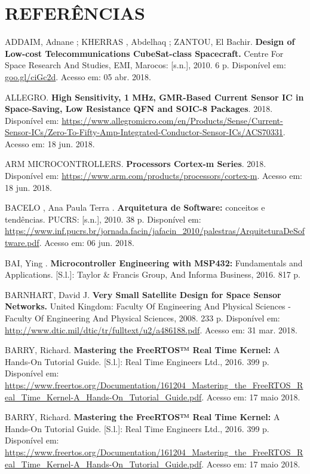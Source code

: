 \chapter[REFERÊNCIAS]{REFERÊNCIAS}

\noindent ADDAIM, Adnane ; KHERRAS , Abdelhaq ; ZANTOU, El Bachir. \textbf{Design of Low-cost Telecommunications CubeSat-class Spacecraft. } Centre For Space Research And Studies, EMI, Marocos: [s.n.], 2010. 6 p. Disponível em: \url{goo.gl/ciGc2d}. Acesso em: 05 abr. 2018.

\noindent ALLEGRO. \textbf{High Sensitivity, 1 MHz, GMR-Based Current Sensor IC  in Space-Saving, Low Resistance QFN and SOIC-8 Packages}. 2018. Disponível em: \url{https://www.allegromicro.com/en/Products/Sense/Current-Sensor-ICs/Zero-To-Fifty-Amp-Integrated-Conductor-Sensor-ICs/ACS70331}. Acesso em: 18 jun. 2018.

\noindent ARM MICROCONTROLLERS. \textbf{Processors Cortex-m Series}. 2018. Disponível em: \url{https://www.arm.com/products/processors/cortex-m}. Acesso em: 18 jun. 2018.

\noindent BACELO , Ana Paula Terra . \textbf{Arquitetura de Software:} conceitos e tendências. PUCRS: [s.n.], 2010. 38 p. Disponível em: \url{https://www.inf.pucrs.br/jornada.facin/jafacin_2010/palestras/ArquiteturaDeSoftware.pdf}. Acesso em: 06 jun. 2018.

\noindent BAI, Ying . \textbf{Microcontroller Engineering with MSP432:} Fundamentals and Applications. [S.l.]: Taylor \& Francis Group, And Informa Business, 2016. 817 p.

\noindent BARNHART, David J. \textbf{Very Small Satellite Design for Space Sensor Networks. } United Kingdom: Faculty Of Engineering And Physical Sciences - Faculty Of Engineering And Physical Sciences, 2008. 233 p. Disponível em: \url{http://www.dtic.mil/dtic/tr/fulltext/u2/a486188.pdf}. Acesso em: 31 mar. 2018.

\noindent BARRY, Richard. \textbf{Mastering the FreeRTOS™ Real Time Kernel:} A Hands-On Tutorial Guide. [S.l.]: Real Time Engineers Ltd., 2016. 399 p. Disponível em: \url{https://www.freertos.org/Documentation/161204_Mastering_the_FreeRTOS_Real_Time_Kernel-A_Hands-On_Tutorial_Guide.pdf}. Acesso em: 17 maio 2018.

\noindent BARRY, Richard. \textbf{Mastering the FreeRTOS™ Real Time Kernel:} A Hands-On Tutorial Guide. [S.l.]: Real Time Engineers Ltd., 2016. 399 p. Disponível em: \url{https://www.freertos.org/Documentation/161204_Mastering_the_FreeRTOS_Real_Time_Kernel-A_Hands-On_Tutorial_Guide.pdf}. Acesso em: 17 maio 2018.

